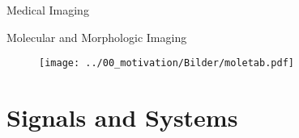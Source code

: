 \begin{frame}[c]{Medical Imaging}
\end{frame}

\begin{frame}[c]{Molecular and Morphologic Imaging}
    \begin{figure}
        \texttt{[image: ../00\_motivation/Bilder/moletab.pdf]}
    \end{figure}
\end{frame}

\section{Signals and Systems} %


